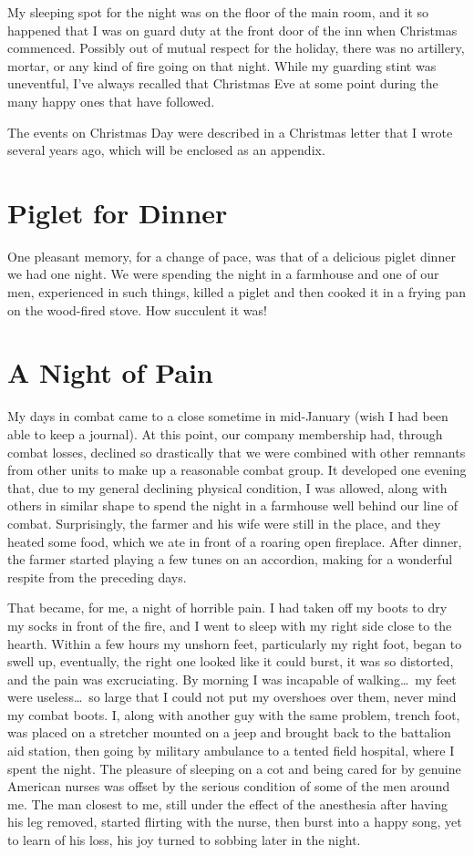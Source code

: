 \documentclass[../m3y]{subfiles}
\begin{document}
My sleeping spot for the night was on the floor of the main room, and it so happened that I was on guard duty at the front door of the inn when Christmas commenced. Possibly out of mutual respect for the holiday, there was no artillery, mortar, or any kind of fire going on that night. While my guarding stint was uneventful, I've always recalled that Christmas Eve at some point during the many happy ones that have followed.

The events on Christmas Day were described in a Christmas letter that I wrote several years ago, which will be enclosed as an appendix.

\section{Piglet for Dinner}
One pleasant memory, for a change of pace, was that of a delicious piglet dinner we had one night. We were spending the night in a farmhouse and one of our men, experienced in such things, killed a piglet and then cooked it in a frying pan on the wood-fired stove. How succulent it was!

\section{A Night of Pain}
My days in combat came to a close sometime in mid-January (wish I had been able to keep a journal). At this point, our company membership had, through combat losses, declined so drastically that we were combined with other remnants from other units to make up a reasonable combat group. It developed one evening that, due to my general declining physical condition, I was allowed, along with others in similar shape to spend the night in a farmhouse well behind our line of combat. Surprisingly, the farmer and his wife were still in the place, and they heated some food, which we ate in front of a roaring open fireplace. After dinner, the farmer started playing a few tunes on an accordion, making for a wonderful respite from the preceding days.

That became, for me, a night of horrible pain. I had taken off my boots to dry my socks in front of the fire, and I went to sleep with my right side close to the hearth. Within a few hours my unshorn feet, particularly my right foot, began to swell up, eventually, the right one looked like it could burst, it was so distorted, and the pain was excruciating. By morning I was incapable of walking\ldots\ my feet were useless\ldots\ so large that I could not put my overshoes over them, never mind my combat boots. I, along with another guy with the same problem, trench foot, was placed on a stretcher mounted on a jeep and brought back to the battalion aid station, then going by military ambulance to a tented field hospital, where I spent the night. The pleasure of sleeping on a cot and being cared for by genuine American nurses was offset by the serious condition of some of the men around me. The man closest to me, still under the effect of the anesthesia after having his leg removed, started flirting with the nurse, then burst into a happy song, yet to learn of his loss, his joy turned to sobbing later in the night.
\end{document}

